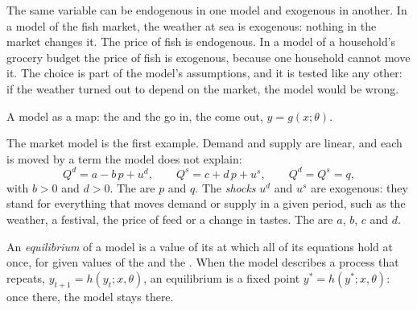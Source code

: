 The same variable can be endogenous in one model and exogenous in another.
In a model of the fish market, the weather at sea is exogenous: nothing in
the market changes it. The price of fish is endogenous. In a model of a
household's grocery budget the price of fish is exogenous, because one
household cannot move it. The choice is part of the model's assumptions,
and it is tested like any other: if the weather turned out to depend on
the market, the model would be wrong.

\begin{omfigure}

{\small A model as a map: the  and the  go in,
the  come out, $y = g(x; \theta)$.}
\end{omfigure}

The market model is the first example. Demand and supply are linear, and
each is moved by a term the model does not explain:
\begin{equation}\label{eq:b1:models-and-data:market}
Q^d = a - b\,p + u^d, \qquad Q^s = c + d\,p + u^s, \qquad Q^d = Q^s = q,
\end{equation}
with $b > 0$ and $d > 0$. The  are $p$ and $q$. The
\emph{shocks} $u^d$ and $u^s$ are exogenous: they stand for everything that
moves demand or supply in a given period, such as the weather, a festival,
the price of feed or a change in tastes. The  are $a$, $b$, $c$
and $d$.

\begin{definition}\label{def:b1:models-and-data:equilibrium}
An \emph{equilibrium} of a model is a value of its  at
which all of its equations hold at once, for given values of the  and the . When the model describes a process that
repeats, $y_{t+1} = h(y_t; x, \theta)$, an equilibrium is a fixed point
$y^* = h(y^*; x, \theta)$: once there, the model stays there.
\end{definition}

